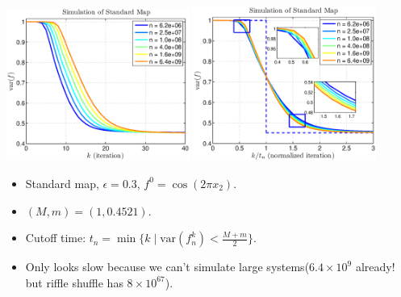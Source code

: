 \documentclass[12pt,t]{beamer}
\begin{document}
\begin{frame}
\begin{center}
    \includegraphics[width=0.45\textwidth,trim=1cm 1cm 0cm 0cm]{standardmapcutoff2}
    \includegraphics[width=0.45\textwidth,trim=1cm 1cm 0cm 0cm]{standardmapcutoffn2}
\end{center}
  \begin{itemize}
    \item Standard map, $\epsilon = 0.3$, $f^0 = \cos(2\pi x_2)$.
    \item $(M,m) = (1,0.4521)$.
    \item Cutoff time: $t_n =\min \{ k \mid \text{var}(f^k_n)< \frac{M+m}{2}\}. $
    \item Only looks slow because we can't simulate large systems($6.4\times 10^9$ already! but riffle shuffle has $8 \times 10^{67}$).
\end{itemize}

\end{frame}
\end{document}
